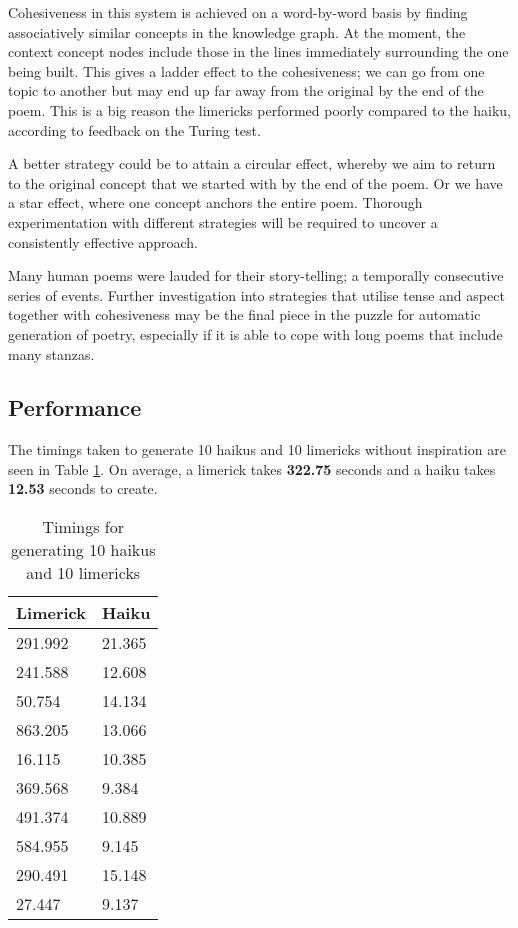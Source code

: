 Cohesiveness in this system is achieved on a word-by-word basis by finding associatively similar concepts in the knowledge graph. At the moment, the context concept nodes include those in the lines immediately surrounding the one being built. This gives a ladder effect to the cohesiveness; we can go from one topic to another but may end up far away from the original by the end of the poem. This is a big reason the limericks performed poorly compared to the haiku, according to feedback on the Turing test.

A better strategy could be to attain a circular effect, whereby we aim to return to the original concept that we started with by the end of the poem. Or we have a star effect, where one concept anchors the entire poem. Thorough experimentation with different strategies will be required to uncover a consistently effective approach.

Many human poems were lauded for their story-telling; a temporally consecutive series of events. Further investigation into strategies that utilise tense and aspect together with cohesiveness may be the final piece in the puzzle for automatic generation of poetry, especially if it is able to cope with long poems that include many stanzas.


\subsection{Performance}
The timings taken to generate 10 haikus and 10 limericks without inspiration are seen in Table \ref{tab:gen}. On average, a limerick takes \textbf{322.75} seconds and a haiku takes \textbf{12.53} seconds to create.

\begin{table}
\centering
    \begin{tabular}{|l|l|}
    \hline
    Limerick & Haiku  \\ \hline
    291.992  & 21.365 \\
    241.588  & 12.608 \\
    50.754   & 14.134 \\
    863.205  & 13.066 \\
    16.115   & 10.385 \\
    369.568  & 9.384  \\
    491.374  & 10.889 \\
    584.955  & 9.145  \\
    290.491  & 15.148 \\
    27.447   & 9.137  \\ \hline
    \end{tabular}
\caption{Timings for generating 10 haikus and 10 limericks}
\label{tab:gen}
\end{table}

